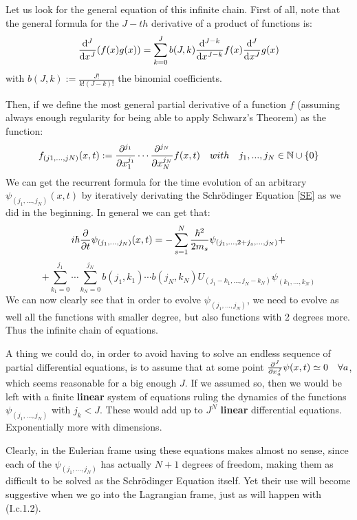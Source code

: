 \documentclass[11pt, a4paper]{article} %
\newcommand{\N}{\mathbb{N}}
\begin{document}
Let us look for the general equation of this infinite chain. First of all, note that the general formula for the $J-th$ derivative of a product of functions is:
\begin{equation}
\dv[J]{}{x}\qty(f(x)g(x))=\sum_{k=0}^J b(J, k)\dv[J-k]{}{x}f(x)\dv[J]{}{x}g(x)
\end{equation}
with $b(J,k):=\frac{J!}{k!(J-k)!}$ the binomial coefficients.

Then, if we define the most general partial derivative of a function $f$ (assuming always enough regularity for being able to apply Schwarz's Theorem) as the function:
\begin{equation}\label{defPdv}
f_{(j1,...,jN)}(x,t):=\pdv[j_1]{}{x_1}\cdots\pdv[j_N]{}{x_N} f(x,t) \quad with\quad j_1,...,j_N\in \N\cup \{0\}
\end{equation}
We can get the recurrent formula for the time evolution of an arbitrary $\psi_{(j_1,...,j_N)}(x,t)$ by iteratively derivating the Schrödinger Equation \eqref{SE} as we did in the beginning. In general we can get that:
\begin{equation}\label{infchain.SE}
i\hbar \pdv{}{t}\psi_{(j_1,...,j_N)}(x,t)=-\sum_{s=1}^N\frac{\hbar^2}{2m_s}\psi_{(j_1,...,2+j_s,...,j_N)}+
\end{equation}
$$
+\sum_{k_1=0}^{j_1}\cdots\sum_{k_N=0}^{j_N} b(j_1,k_1)\cdots b(j_N,k_N)U_{(j_1-k_1,...,j_N-k_N)}\psi_{(k_1,...,k_N)}
$$
We can now clearly see that in order to evolve $\psi_{(j_1,...,j_N)}$, we need to evolve as well all the functions with smaller degree, but also functions with 2 degrees more. Thus the infinite chain of equations.

A thing we could do, in order to avoid having to solve an endless sequence of partial differential equations, is to assume that at some point $\pdv[J]{}{x_a}\psi(x,t)\simeq 0\quad \forall a$, which seems reasonable for a big enough $J$. If we assumed so, then we would be left with a finite {\bf linear} system of equations ruling the dynamics of the functions $\psi_{(j_1,...,j_N)}$ with $j_k<J$. These would add up to $J^N$ {\bf linear} differential equations. Exponentially more with dimensions.

Clearly, in the Eulerian frame using these equations makes almost no sense, since each of the $\psi_{(j_1,...,j_N)}$ has actually $N+1$ degrees of freedom, making them as difficult to be solved as the Schrödinger Equation itself. Yet their use will become suggestive when we go into the Lagrangian frame, just as will happen with (I.c.1.2).\vspace{-0.3cm}
\end{document}
